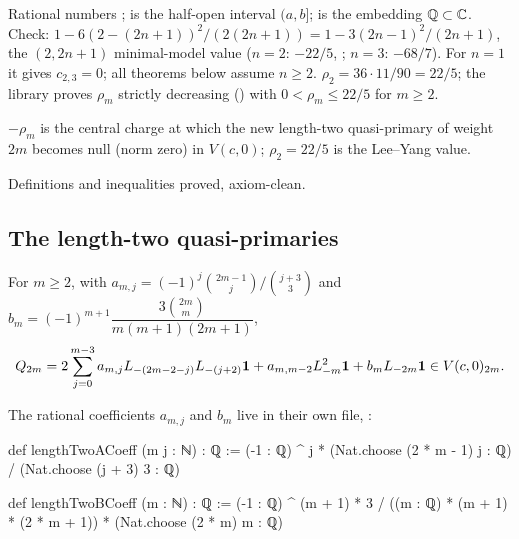 \begin{dictionary}
Rational numbers ;  is the half-open interval $(a,b]$;  is the
embedding ${\mathbb{Q}}\subset{\mathbb{C}}$. Check: $1-6(2-(2n+1))^2/(2(2n+1)) = 1-3(2n-1)^2/(2n+1)$, the $(2,2n+1)$
minimal-model value ($n=2$: $-22/5$, \allowbreak{}\allowbreak{}\allowbreak{}; $n=3$: $-68/7$). For $n=1$ it
gives $c_{2,3} = 0$; all theorems below assume $n\ge2$. $\rho_2 = 36\cdot11/90 = 22/5$; the library proves
$\rho_m$ strictly decreasing () with $0<\rho_m\le22/5$ for $m\ge2$.
\end{dictionary}

\begin{physics}
$-\rho_m$ is the central charge at which the new length-two quasi-primary of weight $2m$ becomes null
(norm zero) in $V(c,0)$; $\rho_2 = 22/5$ is the Lee--Yang value.
\end{physics}

\begin{status}
Definitions and inequalities proved, axiom-clean.
\end{status}

\subsection{The length-two quasi-primaries}

\begin{definition}[$Q_{2m}$]\label{l19:def:Q}
For $m\ge2$, with $a_{m,j} = (-1)^j\binom{2m-1}{j}/\binom{j+3}{3}$ and
$b_m = (-1)^{m+1}\dfrac{3\binom{2m}{m}}{m(m+1)(2m+1)}$,
\begin{equation*}
 Q_{2m} = 2\sum_{j=0}^{m-3}a_{m,j}L_{-(2m-2-j)}L_{-(j+2)}\mathbf{1} + a_{m,m-2}L_{-m}^2\mathbf{1} +
 b_mL_{-2m}\mathbf{1}\in V(c,0)_{2m}.
\end{equation*}
\end{definition}

\noindent The rational coefficients $a_{m,j}$ and $b_m$ live in their own file,
:
\begin{leancode}
def lengthTwoACoeff (m j : ℕ) : ℚ :=
  (-1 : ℚ) ^ j * (Nat.choose (2 * m - 1) j : ℚ) / (Nat.choose (j + 3) 3 : ℚ)

def lengthTwoBCoeff (m : ℕ) : ℚ :=
  (-1 : ℚ) ^ (m + 1) * 3 / ((m : ℚ) * (m + 1) * (2 * m + 1)) *
    (Nat.choose (2 * m) m : ℚ)
\end{leancode}

